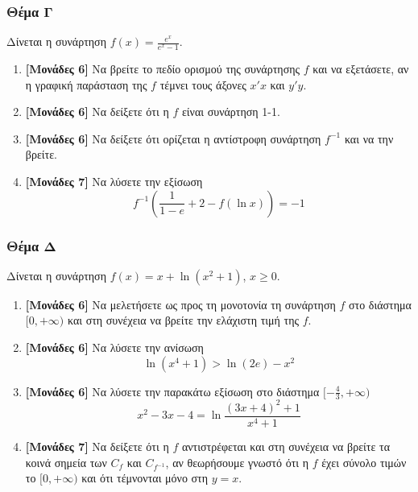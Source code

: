 \documentclass[12pt]{article}
\begin{document}
\section*{Θέμα Γ}
  \noindent
  Δίνεται η συνάρτηση $f(x)=\frac{e^x}{e^x-1}$.
  \begin{enumerate}
    \item \textbf{[Μονάδες 6]} Να βρείτε το πεδίο ορισμού της συνάρτησης $f$ και να εξετάσετε, αν η γραφική παράσταση της $f$ τέμνει τους άξονες $x'x$ και $y'y$.
    \item \textbf{[Μονάδες 6]} Να δείξετε ότι η $f$ είναι συνάρτηση 1-1.
    \item \textbf{[Μονάδες 6]} Να δείξετε ότι ορίζεται η αντίστροφη συνάρτηση $f^{-1}$ και να την βρείτε.
    \item \textbf{[Μονάδες 7]} Να λύσετε την εξίσωση
    $$f^{-1}\left(\frac{1}{1-e}+2-f(\ln x)\right)=-1$$
  \end{enumerate}

  \section*{Θέμα Δ}
    \noindent
    Δίνεται η συνάρτηση $f(x)=x+\ln(x^2+1)$, $x\ge 0$.
    \begin{enumerate}
      \item \textbf{[Μονάδες 6]} Να μελετήσετε ως προς τη μονοτονία τη συνάρτηση $f$ στο διάστημα $[0,+\infty)$ και στη συνέχεια να βρείτε την ελάχιστη τιμή της $f$.
      \item \textbf{[Μονάδες 6]} Να λύσετε την ανίσωση
      $$\ln (x^4+1)>\ln (2e)-x^2$$
      \item \textbf{[Μονάδες 6]} Να λύσετε την παρακάτω εξίσωση στο διάστημα $[-\frac{4}{3},+\infty)$
$$x^2-3x-4=\ln \frac{(3x+4)^2+1}{x^4+1}$$
      \item \textbf{[Μονάδες 7]} Να δείξετε ότι η $f$ αντιστρέφεται και στη συνέχεια να βρείτε τα κοινά σημεία των $C_f$ και $C_{f^{-1}}$, αν θεωρήσουμε γνωστό ότι η $f$ έχει σύνολο τιμών το $[0,+\infty)$ και ότι τέμνονται μόνο στη $y=x$.
    \end{enumerate}

\vspace{2\baselineskip}

\part*{}
\end{document}
